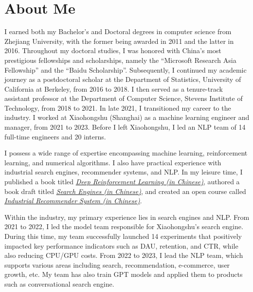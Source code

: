 \documentclass[11pt,a4paper]{moderncv}
\begin{document}
\maketitle
\vspace*{-14mm}



\section{About Me}


\qquad
I earned both my Bachelor's and Doctoral degrees in computer science from Zhejiang University, with the former being awarded in 2011 and the latter in 2016. Throughout my doctoral studies, I was honored with China's most prestigious fellowships and scholarships, namely the ``Microsoft Research Asia Fellowship'' and the ``Baidu Scholarship''. Subsequently, I continued my academic journey as a postdoctoral scholar at the Department of Statistics, University of California at Berkeley, from 2016 to 2018. I then served as a tenure-track assistant professor at the Department of Computer Science, Stevens Institute of Technology, from 2018 to 2021. In late 2021, I transitioned my career to the industry. I worked at Xiaohongshu (Shanghai) as a machine learning engineer and manager, from 2021 to 2023. Before I left Xiaohongshu, I led an NLP team of 14 full-time engineers and 20 interns.



\qquad
I possess a wide range of expertise encompassing machine learning, reinforcement learning, and numerical algorithms. I also have practical experience with industrial search engines, recommender systems, and NLP. In my leisure time, I published a book titled \href{https://github.com/wangshusen/DRL/tree/master/Notes_CN}{\textit{Deep Reinforcement Learning (in Chinese)}}, authored a book draft titled \href{https://github.com/wangshusen/SearchEngine}{\textit{Search Engines (in Chinese)}}, and created an open course called \href{https://github.com/wangshusen/RecommenderSystem}{\textit{Industrial Recommender System (in Chinese)}}.




\qquad
Within the industry, my primary experience lies in search engines and NLP. From 2021 to  2022, I led the model team responsible for Xiaohongshu's search engine. During this time, my team successfully launched 14 experiments that positively impacted key performance indicators such as DAU, retention, and CTR, while also reducing CPU/GPU costs. From 2022 to 2023, I lead the NLP team, which supports various areas including search, recommendation, e-commerce, user growth, etc. My team has also train GPT models and applied them to products such as conversational search engine.
\end{document}
